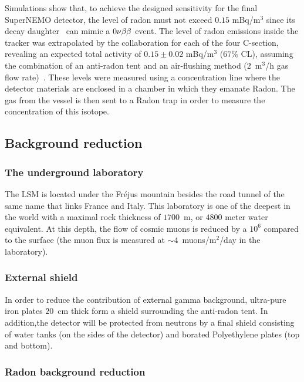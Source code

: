 Simulations show that, to achieve the designed sensitivity for the final SuperNEMO detector, the level of radon must not exceed $0.15$ mBq/m$^{3}$ since its decay daughter \Bi\ can mimic a $0\nu\beta\beta$ event.
The level of radon emissions inside the tracker was extrapolated by the collaboration for each of the four C-section, revealing an expected total activity of $0.15\pm0.02$ mBq/m$^{3}$ ($67$\% CL), assuming the combination of an anti-radon tent and an air-flushing method ($2$~m$^{3}$/h gas flow rate)~\cite{conf:radon2017}.
These levels were measured using a concentration line where the detector materials are enclosed in a chamber in which they emanate Radon.
The gas from the vessel is then sent to a Radon trap in order to measure the concentration of this isotope.


\subsection{Background reduction}
\label{subsec:background_reduc}

\subsubsection*{The underground laboratory}

The LSM is located under the Fréjus mountain besides the road tunnel of the same name that links France and Italy.
This laboratory is one of the deepest in the world with a maximal rock thickness of $1700$~m, or $4800$ meter water equivalent.
At this depth, the flow of cosmic muons is reduced by a $10^{6}$ compared to the surface (the muon flux is measured at $\sim4$~muons/m$^{2}$/day in the laboratory).

\subsubsection*{External shield}

In order to reduce the contribution of external gamma background, ultra-pure iron plates $20$~cm thick form a shield surrounding the anti-radon tent.
In addition,the detector will be protected from neutrons by a final shield consisting of water tanks (on the sides of the detector) and borated Polyethylene plates (top and bottom).

\subsubsection*{Radon background reduction}

